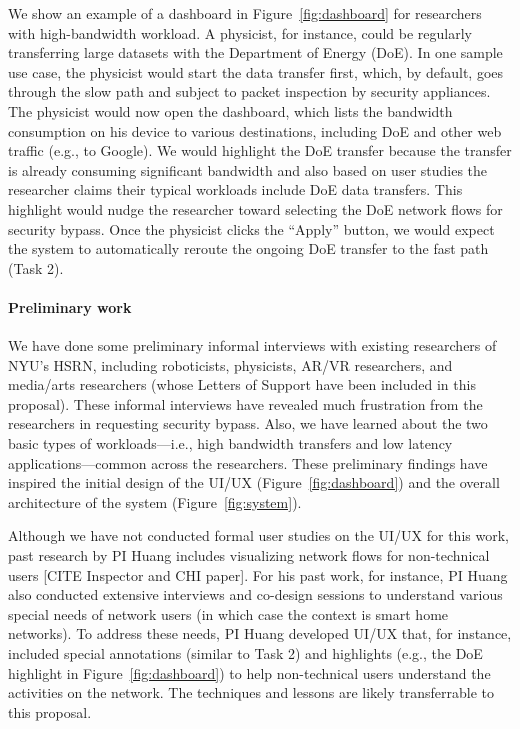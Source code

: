We show an example of a dashboard in Figure~\ref{fig:dashboard} for researchers with high-bandwidth workload. A physicist, for instance, could be regularly transferring large datasets with the Department of Energy (DoE). In one sample use case, the physicist would start the data transfer first, which, by default, goes through the slow path and subject to packet inspection by security appliances. The physicist would now open the dashboard, which lists the bandwidth consumption on his device to various destinations, including DoE and other web traffic (e.g., to Google). We would highlight the DoE transfer because the transfer is already consuming significant bandwidth and also based on user studies the researcher claims their typical workloads include DoE data transfers. This highlight would nudge the researcher toward selecting the DoE network flows for security bypass. Once the physicist clicks the ``Apply'' button, we would expect the system to automatically reroute the ongoing DoE transfer to the fast path (Task 2).


\paragraph{Preliminary work}
We have done some preliminary informal interviews with existing researchers of NYU's HSRN, including roboticists, physicists, AR/VR researchers, and media/arts researchers (whose Letters of Support have been included in this proposal). These informal interviews have revealed much frustration from the researchers in requesting security bypass. Also, we have learned about the two basic types of workloads---i.e., high bandwidth transfers and low latency applications---common across the researchers. These preliminary findings have inspired the initial design of the UI/UX (Figure~\ref{fig:dashboard}) and the overall architecture of the system (Figure~\ref{fig:system}).

Although we have not conducted formal user studies on the UI/UX for this work, past research by PI Huang includes visualizing network flows for non-technical users [CITE Inspector and CHI paper]. For his past work, for instance, PI Huang also conducted extensive interviews and co-design sessions to understand various special needs of network users (in which case the context is smart home networks). To address these needs, PI Huang developed UI/UX that, for instance, included special annotations (similar to Task 2) and highlights (e.g., the DoE highlight in Figure~\ref{fig:dashboard}) to help non-technical users understand the activities on the network. The techniques and lessons are likely transferrable to this proposal.

